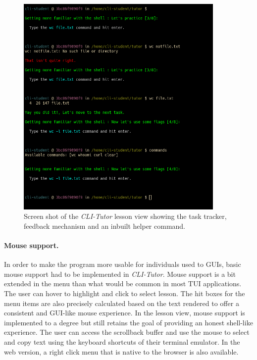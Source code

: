 \begin{figure}[htbp]
    \centering
    \includegraphics[width=0.9\textwidth]{img/lessonview}
    \caption{Screen shot of the \textit{CLI-Tutor} lesson view showing the task tracker, feedback mechanism and an inbuilt helper command.}
    \label{fig:lessonview}
\end{figure}


\paragraph{Mouse support.} In order to make the program more usable for
individuals used to GUIs, basic mouse support had to be implemented in
\textit{CLI-Tutor}. Mouse support is a bit extended in the menu than what would
be common in most TUI applications. The user can hover to highlight and click
to select lesson. The hit boxes for the menu items are also precisely
calculated based on the text rendered to offer a consistent and GUI-like mouse
experience. In the lesson view, mouse support is implemented to a degree but
still retains the goal of providing an honest shell-like experience. The user
can access the scrollback buffer and use the mouse to select and copy text
using the keyboard shortcuts of their terminal emulator. In the web version, a
right click menu that is native to the browser is also available.

